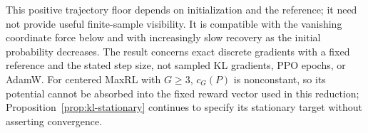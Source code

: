 This positive trajectory floor depends on initialization and the reference;
it need not provide useful finite-sample visibility. It is compatible with
the vanishing coordinate force below and with increasingly slow recovery
as the initial probability decreases. The result concerns exact discrete
gradients with a fixed reference and the stated step size, not sampled KL
gradients, PPO epochs, or AdamW. For centered MaxRL with $G\ge3$,
$c_G(P)$ is nonconstant, so its potential cannot be absorbed into the fixed
reward vector used in this reduction; Proposition~\ref{prop:kl-stationary}
continues to specify its stationary target without asserting convergence.
